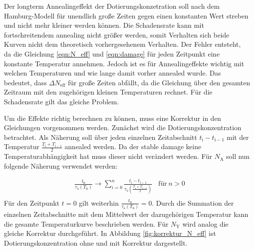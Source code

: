 Der longterm Annealingeffekt der Dotierungskonzetration soll nach dem Hamburg-Modell
für unendlich große Zeiten gegen einen konstanten Wert streben und nicht mehr
kleiner werden können. Die Schadensrate kann mit fortschreitendem annealing nicht
größer werden, somit Verhalten sich beide Kurven nicht dem theoretisch
vorhergesehenem Verhalten.
Der Fehler entsteht, da die Gleichung \ref{eqn:N_eff} und \ref{eqn:damage} für jeden
Zeitpunkt eine konstante Temperatur annehmen. Jedoch ist es für Annealingeffekte
wichtig mit welchen Temperaturen und wie lange damit vorher annealed wurde.
Das bedeutet, dass $\Delta N_{\mathrm{eff}}$ für große Zeiten abfällt, da die Gleichung über den
gesamten Zeitraum mit den zugehörigen kleinen Temperaturen rechnet. Für
die Schadensrate gilt das gleiche Problem.

Um die Effekte richtig berechnen zu können, muss eine Korrektur in den
Gleichungen vorgenommen werden.
Zunächst wird die Dotierungskonzentration betrachtet. Als Näherung soll über
jeden einzelnen Zeitabschnitt $t_{\mathrm{i}} - t_{\mathrm{i-1}}$ mit der
Temperatur $\frac{T_{\mathrm{i}} +T_{\mathrm{i-1}}}{2}$ annealed werden.
Da der stable damage keine Temperaturabhängigkeit hat muss dieser nicht
verändert werden. Für $N_{\mathrm{A}}$ soll nun folgende Näherung
verwendet werden:

\begin{align}
  &\frac{t_{\mathrm{n}}}{\tau_{\mathrm{a}}(T_{\mathrm{n}})} \rightarrow \sum_{i=0}^n  \frac{t_{\mathrm{i}} - t_{\mathrm{i-1}}}{\tau_{\mathrm{a}}(\frac{T_{\mathrm{i}} +T_{\mathrm{i-1}}}{2})} \:\:\:\: \text{für} \: n>0 \\
\end{align}
Für den Zeitpunkt $t=0$ gilt weiterhin $\frac{t_{\mathrm{n}}}{\tau_{\mathrm{a}}(T_{\mathrm{n}})} = 0$.
Durch die Summation der einzelnen Zeitabschnitte mit dem Mittelwert der dazugehörigen
Temperatur kann die gesamte Temperaturkurve beschrieben werden. Für $N_{\mathrm{Y}}$
wird analog die gleiche Korrektur durchgeführt.
In Abbildung \ref{fig:korrektur_N_eff} ist Dotierungskonzentration ohne und mit Korrektur dargestellt.



